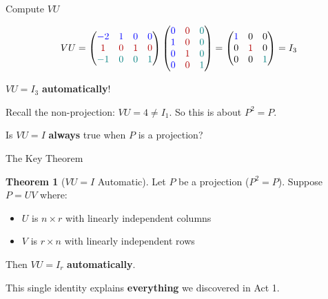 \documentclass[10pt]{beamer}
\theoremstyle{definition}
\newtheorem{thm}{Theorem}[section]
\newcommand{\x}[1]{\alert{\textbf{#1}}}
\newcommand{\bl}[1]{{\color{blue}#1}}                 %
\newcommand{\rd}[1]{{\color{red!70!black}#1}}         %
\newcommand{\tl}[1]{{\color{teal}#1}}                 %
\begin{document}
\begin{frame}{Compute $VU$}

$$VU = \begin{pmatrix} \bl{-2} & \bl{1} & \bl{0} & \bl{0} \\ \rd{1} & \rd{0} & \rd{1} & \rd{0} \\ \tl{-1} & \tl{0} & \tl{0} & \tl{1} \end{pmatrix} \begin{pmatrix} \bl{0} & \rd{0} & \tl{0} \\ \bl{1} & \rd{0} & \tl{0} \\ \bl{0} & \rd{1} & \tl{0} \\ \bl{0} & \rd{0} & \tl{1} \end{pmatrix} = \begin{pmatrix} \bl{1} & 0 & 0 \\ 0 & \rd{1} & 0 \\ 0 & 0 & \tl{1} \end{pmatrix} = I_3$$

\vspace{0.5em}

$VU = I_3$ \x{automatically}!

\vspace{0.5em}

Recall the non-projection: $VU = 4 \neq I_1$. \quad So this is about $P^2 = P$.

\vspace{0.5em}

Is $VU = I$ \x{always} true when $P$ is a projection?

\end{frame}

\begin{frame}{The Key Theorem}

\begin{thm}[$VU = I$ Automatic]
Let $P$ be a projection ($P^2 = P$). Suppose $P = UV$ where:
\begin{itemize}
\item $U$ is $n \times r$ with linearly independent columns
\item $V$ is $r \times n$ with linearly independent rows
\end{itemize}

Then $VU = I_r$ \x{automatically}.
\end{thm}

\vspace{1em}

This single identity explains \x{everything} we discovered in Act 1.

\end{frame}
\end{document}
